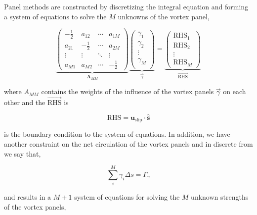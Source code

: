 Panel methods are constructed by discretizing the integral equation and forming a system of equations to solve the $M$ unknowns of the vortex panel,

	\begin{equation}
	\underbrace{\begin{pmatrix}
	-\frac{1}{2} & a_{12} & \cdots & a_{1M}\\ 
	a_{21} & -\frac{1}{2} & \cdots & a_{2M}\\
	\vdots & \vdots & \ddots & \vdots\\ 
	a_{M1} & a_{M2} & \cdots & -\frac{1}{2}
	\end{pmatrix}}_{\mathbf{A}_{MM}} \underbrace{\begin{pmatrix}
	\gamma_{1}\\ \gamma_{2}\\
	\vdots\\
	\gamma_M\\
	\end{pmatrix}}_{\vec{\gamma}} = \underbrace{\begin{pmatrix}
	\mathrm{RHS}_1\\ 
	\mathrm{RHS}_2\\ 
	\vdots\\
	\mathrm{RHS}_M
	\end{pmatrix}}_{\overrightarrow{\mathrm{RHS}}}
	\end{equation}


where $A_{MM}$ contains the weights of the influence of the vortex panels $\vec{\gamma}$ on each other and the $\overrightarrow{\mathrm{RHS}}$ is

	\begin{equation}
	\mathrm{RHS} = \mathbf{u}_{\mathrm{slip}}\cdot\mathbf{\hat{s}}
	\end{equation}
	
is the boundary condition to the system of equations. In addition, we have another constraint on the net circulation of the vortex panels and in discrete from we say that,

	\begin{equation}
	\sum_{i}^{M} \gamma_i\Delta s = \Gamma_{\gamma}
	\end{equation}	

and results in a $M+1$ system of equations for solving the $M$ unknown strengths of the vortex panels,

